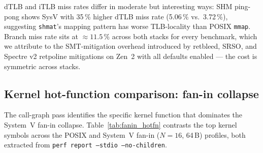 \documentclass[a4paper,11pt]{article}
\begin{document}
dTLB and iTLB miss rates differ in moderate but interesting ways: SHM
ping-pong shows SysV with 35\,\% higher dTLB miss rate (5.06\,\% vs.\
3.72\,\%), suggesting \texttt{shmat}'s mapping pattern has worse
TLB-locality than POSIX \texttt{mmap}. Branch miss rate sits at
$\approx 11.5\,\%$ across both stacks for every benchmark, which we
attribute to the SMT-mitigation overhead introduced by retbleed,
SRSO, and Spectre v2 retpoline mitigations on Zen~2 with all
defaults enabled --- the cost is symmetric across stacks.

\subsection{Kernel hot-function comparison: fan-in collapse}
\label{sec:perf:hotfn}

The call-graph pass identifies the specific kernel function that
dominates the System~V fan-in collapse. Table~\ref{tab:fanin_hotfn}
contrasts the top kernel symbols across the POSIX and System~V
fan-in ($N=16$, 64\,B) profiles, both extracted from
\texttt{perf report --stdio --no-children}.
\end{document}
